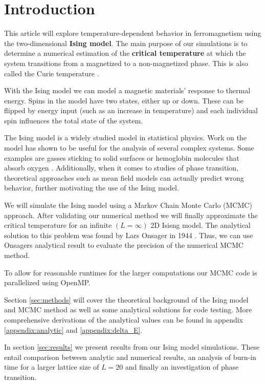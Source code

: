 \documentclass[english,notitlepage,reprint,nofootinbib]{revtex4-1}  %
\begin{document}
\section{Introduction}\label{sec:intro}
This article will explore temperature-dependent behavior in ferromagnetism using the two-dimensional \textbf{Ising model}. The main purpose of our simulations is to determine a numerical estimation of the \textbf{critical temperature} at which the system transitions from a magnetized to a non-magnetized phase. This is also called the Curie temperature \cite{compendium}.

With the Ising model we can model a magnetic materials' response to thermal energy. Spins in the model have two states, either up or down. These can be flipped by energy input (such as an increase in temperature) and each individual spin influences the total state of the system.

The Ising model is a widely studied model in statistical physics. Work on the model has shown to be useful for the analysis of several complex systems. Some examples are gasses sticking to solid surfaces or hemoglobin molecules that absorb oxygen \cite{compendium}. Additionally, when it comes to studies of phase transition, theoretical approaches such as mean field models can actually predict wrong behavior, further motivating the use of the Ising model.\cite{compendium}

We will simulate the Ising model using a Markov Chain Monte Carlo (MCMC) approach. After validating our numerical method we will finally approximate the critical temperature for an infinite $(L=\infty)$ 2D Isisng model. The analytical solution to this problem was found by Lars Onsager in 1944 \cite{project}. Thus, we can use Onsagers analytical result to evaluate the precision of the numerical MCMC method.

To allow for reasonable runtimes for the larger computations our MCMC code is parallelized using OpenMP.

Section \ref{sec:methods} will cover the theoretical background of the Ising model and MCMC method as well as some analytical solutions for code testing. More comprehensive derivations of the analytical values can be found in appendix \ref{appendix:analytic} and \ref{appendix:delta_E}.

In section \ref{sec:results} we present results from our Ising model simulations. These entail comparison between analytic and numerical results, an analysis of burn-in time for a larger lattice size of $L = 20$ and finally an investigation of phase transition.
\end{document}
